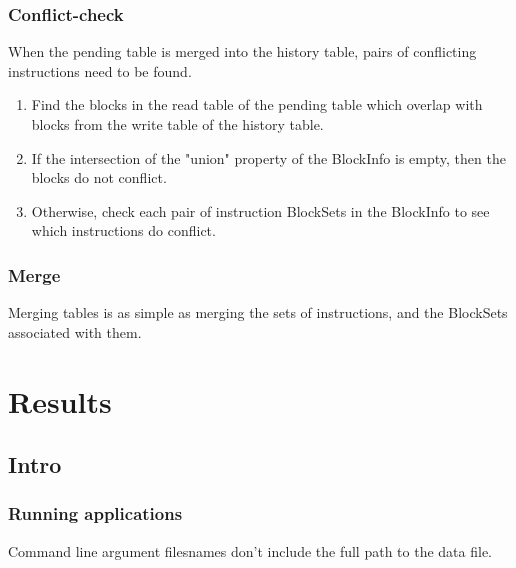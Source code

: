 \documentclass[12pt,twoside]{reedthesis}
\begin{document}
			
			\subsection{Conflict-check}
			
			When the pending table is merged into the history table, pairs of conflicting instructions need to be found. 
			
			\begin{enumerate}
				\item Find the blocks in the read table of the pending table which overlap with blocks from the write table of the history table. 
				\item If the intersection of the "union" property of the BlockInfo is empty, then the blocks do not conflict.
				\item Otherwise, check each pair of instruction BlockSets in the BlockInfo to see which instructions do conflict. 
			\end{enumerate}
			
			
			\subsection{Merge}
			
			Merging tables is as simple as merging the sets of instructions, and the BlockSets associated with them. 
			
			
\chapter{Results}
	
	\section{Intro}
	
		\subsection{Running applications}
		
		Command line argument filesnames don't include the full path to the data file.
		
\end{document}
